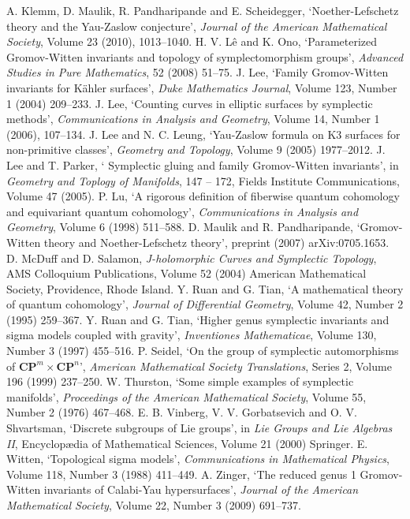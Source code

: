 \documentclass[11pt]{amsart}
\newcommand{\CC}{\mathbf{C}}
\newcommand{\PP}{\mathbf{P}}
\numberwithin{equation}{section}
\theoremstyle{definition}
\theoremstyle{remark}
\begin{document}
\begin{thebibliography}{1}
  A. Klemm, D. Maulik, R. Pandharipande and E. Scheidegger, `Noether-Lefschetz theory and the Yau-Zaslow conjecture', {\em Journal of the American Mathematical Society}, Volume 23 (2010), 1013--1040.
  H. V. L\^{e} and K. Ono, `Parameterized Gromov-Witten invariants and topology of symplectomorphism groups', {\em Advanced Studies in Pure Mathematics}, 52 (2008) 51--75.
  J. Lee, `Family Gromov-Witten invariants for K\"{a}hler surfaces', {\em Duke Mathematics Journal}, Volume 123, Number 1 (2004) 209--233.
  J. Lee, `Counting curves in elliptic surfaces by symplectic methods', {\em Communications in Analysis and Geometry}, Volume 14, Number 1 (2006), 107--134.
  J. Lee and N. C. Leung, `Yau-Zaslow formula on K3 surfaces for non-primitive classes', {\em Geometry and Topology}, Volume 9 (2005) 1977--2012.
  J. Lee and T. Parker, ` Symplectic gluing and family Gromov-Witten invariants', in {\em Geometry and Toplogy of Manifolds}, 147 -- 172, Fields Institute Communications, Volume 47 (2005).
  P. Lu, `A rigorous definition of fiberwise quantum cohomology and equivariant quantum cohomology', {\em Communications in Analysis and Geometry}, Volume 6 (1998) 511--588.
  D. Maulik and R. Pandharipande, `Gromov-Witten theory and Noether-Lefschetz theory', preprint (2007) arXiv:0705.1653.
  D. McDuff and D. Salamon, {\em J-holomorphic Curves and Symplectic Topology}, AMS Colloquium Publications, Volume 52 (2004) American Mathematical Society, Providence, Rhode Island.
  Y. Ruan and G. Tian, `A mathematical theory of quantum cohomology', {\em Journal of Differential Geometry}, Volume 42, Number 2 (1995) 259--367.
  Y. Ruan and G. Tian, `Higher genus symplectic invariants and sigma models coupled with gravity', {\em Inventiones Mathematicae}, Volume 130, Number 3 (1997) 455--516.
  P. Seidel, `On the group of symplectic automorphisms of $\CC\PP^m\times\CC\PP^n$', {\em American Mathematical Society Translations}, Series 2, Volume 196 (1999) 237--250.
  W. Thurston, `Some simple examples of symplectic manifolds', {\em Proceedings of the American Mathematical Society}, Volume 55, Number 2 (1976) 467--468.
  E. B. Vinberg, V. V. Gorbatsevich and O. V. Shvartsman, `Discrete subgroups of Lie groups', in {\em Lie Groups and Lie Algebras II}, Encyclop{\ae}dia of Mathematical Sciences, Volume 21 (2000) Springer.
  E. Witten, `Topological sigma models', {\em Communications in Mathematical Physics}, Volume 118, Number 3 (1988) 411--449.
  A. Zinger, `The reduced genus 1 Gromov-Witten invariants of Calabi-Yau hypersurfaces', {\em Journal of the American Mathematical Society}, Volume 22, Number 3 (2009) 691--737. 
\end{thebibliography}
\end{document}

